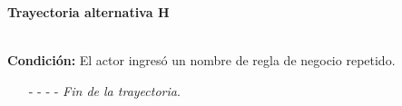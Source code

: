 \hypertarget{CU8-1:TAH}{\textbf{Trayectoria alternativa H}}\\
\noindent \textbf{Condición:} El actor ingresó un nombre de regla de negocio repetido.
\begin{enumerate}
	\UCpaso[\UCsist] Muestra el mensaje  señalando el campo que presenta la duplicidad en la pantalla .
	\UCpaso Regresa al paso \ref{CU8.1-P3} de la trayectoria principal.
	\item[- -] - - {\em {Fin de la trayectoria}}.
\end{enumerate}
